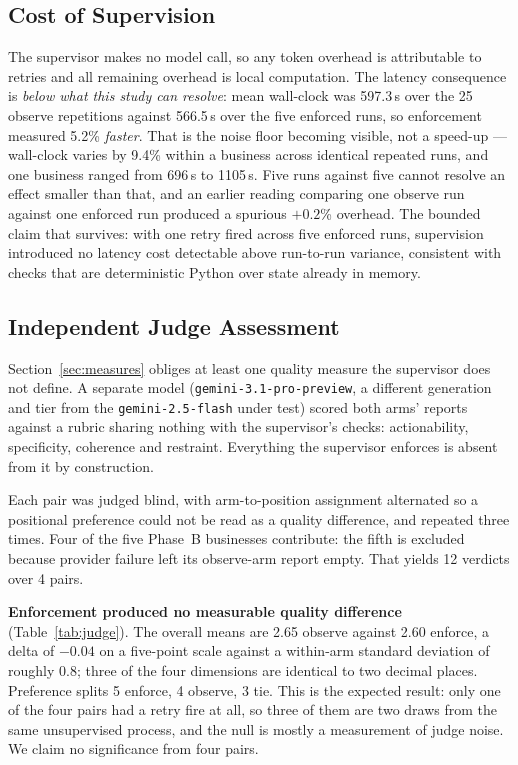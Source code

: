 \documentclass[runningheads]{llncs}
\begin{document}
\subsection{Cost of Supervision}

The supervisor makes no model call, so any token overhead is attributable to
retries and all remaining overhead is local computation. The latency consequence
is \emph{below what this study can resolve}: mean wall-clock was 597.3\,s over the
25 observe repetitions against 566.5\,s over the five enforced runs, so
enforcement measured 5.2\% \emph{faster}. That is the noise floor becoming
visible, not a speed-up --- wall-clock varies by 9.4\% within a business across
identical repeated runs, and one business ranged from 696\,s to 1105\,s. Five runs
against five cannot resolve an effect smaller than that, and an earlier reading
comparing one observe run against one enforced run produced a spurious $+0.2$\%
overhead. The bounded claim that survives: with one retry fired across five
enforced runs, supervision introduced no latency cost detectable above run-to-run
variance, consistent with checks that are deterministic Python over state already
in memory.

\subsection{Independent Judge Assessment}
\label{sec:judge}

Section~\ref{sec:measures} obliges at least one quality measure the supervisor
does not define. A separate model
(\texttt{gemini-3.1-pro-\allowbreak preview}, a different generation and tier from the
\texttt{gemini-2.5-flash} under test) scored both arms' reports against a rubric
sharing nothing with the supervisor's checks: actionability, specificity,
coherence and restraint. Everything the supervisor enforces is absent from it by
construction.

Each pair was judged blind, with arm-to-position assignment alternated so a
positional preference could not be read as a quality difference, and repeated
three times. Four of the five Phase~B businesses contribute: the fifth is excluded
because provider failure left its observe-arm report empty. That yields 12
verdicts over 4 pairs.

\textbf{Enforcement produced no measurable quality difference}
(Table~\ref{tab:judge}). The overall means are 2.65 observe against 2.60 enforce,
a delta of $-0.04$ on a five-point scale against a within-arm standard deviation
of roughly 0.8; three of the four dimensions are identical to two decimal places.
Preference splits 5 enforce, 4 observe, 3 tie. This is the expected result: only
one of the four pairs had a retry fire at all, so three of them are two draws from
the same unsupervised process, and the null is mostly a measurement of judge
noise. We claim no significance from four pairs.
\end{document}
